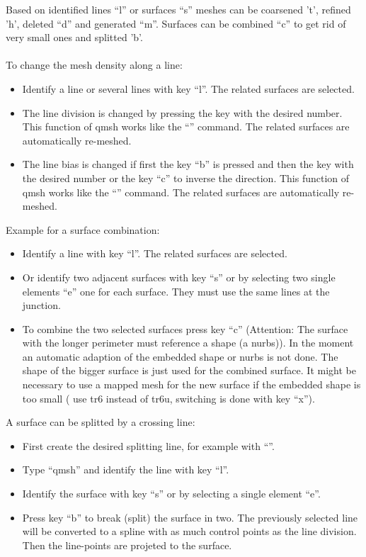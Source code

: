 \documentclass{article}
\begin{document}
Based on identified lines ``l'' or surfaces ``s'' meshes can be coarsened 't', refined 'h', deleted ``d'' and generated ``m''. Surfaces can be combined ``c'' to get rid of very small ones and splitted 'b'.\\\\
To change the mesh density along a line:
\begin{itemize}
\item Identify a line or several lines with key ``l''. The related surfaces are selected.
\item The line division is changed by pressing the key with the desired number. This function of qmsh works like the ``'' command. The related surfaces are automatically re-meshed.
\item The line bias is changed if first the key ``b'' is pressed and then the key with the desired number or the key ``c'' to inverse the direction. This function of qmsh works like the ``'' command. The related surfaces are automatically re-meshed.
\end{itemize}
Example for a surface combination:
\begin{itemize}
\item Identify a line with key ``l''. The related surfaces are selected.
\item Or identify two adjacent surfaces with key ``s'' or by selecting two single elements ``e'' one for each surface. They must use the same lines at the junction. 
\item To combine the two selected surfaces press key ``c'' (Attention: The surface with the longer perimeter must reference a shape (a nurbs)). In the moment an automatic adaption of the embedded shape or nurbs is not done. The shape of the bigger surface is just used for the combined surface. It might be necessary to use a mapped mesh for the new surface if the embedded shape is too small ( use tr6 instead of tr6u, switching is done with key ``x'').
\end{itemize}
A surface can be splitted by a crossing line:
\begin{itemize}
\item First create the desired splitting line, for example with ``''.
\item Type ``qmsh'' and identify the line with key ``l''.
\item Identify the surface with key ``s'' or by selecting a single element ``e''.
\item Press key ``b'' to break (split) the surface in two. The previously selected line will be converted to a spline with as much control points as the line division. Then the line-points are projeted to the surface.
\end{itemize}
\end{document}
